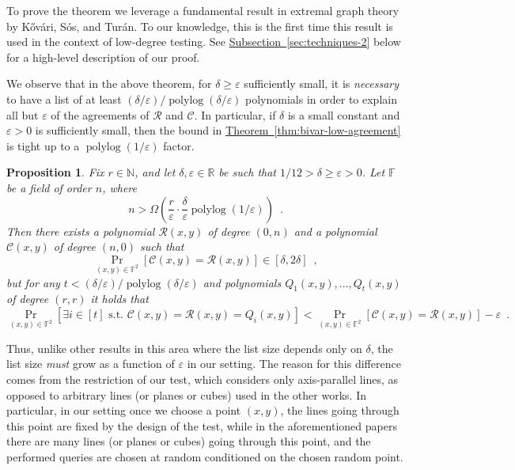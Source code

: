 \documentclass[11pt]{article}
\numberwithin{equation}{section}
\newtheorem{proposition}[theorem]{Proposition}
\theoremstyle{definition}
\theoremstyle{plain}
\newcommand{\expref}[2]{\hyperref[#2]{#1~\ref{#2}}}
\theoremstyle{plain}
\newcommand{\colored}{}
\newcommand{\blocklength}{\colored{n}} %
\newcommand{\Field}{\colored{\mathbb F}}
\newcommand{\st}{\colored{\text{ s.t. }}}
\newcommand{\degree}{\colored{r}}
\newcommand{\rowpoly}{\colored{\mathcal R}}
\newcommand{\colpoly}{\colored{\mathcal C}}
\newcommand{\prox}{\colored{\delta}}
\newcommand{\polylog}{\operatorname{polylog}}
\newcommand{\eps}{\varepsilon}
\newcommand{\Naturals}{\mathbb{N}}
\begin{document}
To prove the theorem we leverage a fundamental result in extremal graph theory by %
K\H{o}v\'{a}ri,    %
S\'{o}s, and Tur\'{a}n.
To our knowledge, this is the first time this result is used in the context of low-degree testing.
See \expref{Subsection}{sec:techniques-2} below for a high-level description of our proof.

We observe that in the above theorem, for $\prox \geq \eps$ sufficiently small, it is \emph{necessary} to have a
list of at least ${(\prox/\eps)}/{\polylog(\prox/\eps)}$ polynomials in order to explain all but $\eps$ of the agreements of $\rowpoly$ and $\colpoly$.
In particular, if $\prox$ is a small constant and $\eps>0$ is sufficiently small,
then the bound in \expref{Theorem}{thm:bivar-low-agreement} is tight up to a $\polylog(1/\eps)$ factor.

\begin{proposition}
\label{prop:list size lb}
Fix $\degree \in \Naturals$, and let $\prox, \eps \in \mathbb R$ be such that ${1}/{12} > \prox \geq \eps > 0$. Let $\Field$ be a field of
%
order   %
$\blocklength$, where
\[
  \blocklength > \Omega\left( \frac{\degree}{\eps} \cdot \frac{\delta}{\eps} \polylog({1}/{\eps})\right)\enspace.
\]
Then there exists a polynomial $\rowpoly(x,y)$ of degree
$(0,\blocklength)$ and a polynomial $\colpoly(x,y)$ of degree
$(\blocklength,0)$ such that
\begin{equation*}
\Pr_{(x,y) \in \Field^2}[\colpoly(x,y) = \rowpoly(x,y)] \in [\prox,2\prox] \enspace,
\end{equation*}
but for any $t < {(\prox/\eps)}/{\polylog(\prox/\eps)}$ and polynomials $Q_1(x,y),\dots,Q_t(x,y)$ of degree $(\degree,\degree)$ it holds that
\begin{equation*}
\Pr_{(x,y) \in \Field^2}
[\exists i \in [t] \st \colpoly(x,y) = \rowpoly(x,y)= Q_i(x,y)]
< \Pr_{(x,y) \in \Field^2}[\colpoly(x,y) = \rowpoly(x,y)] - \eps \enspace.
\end{equation*}
\end{proposition}

Thus, unlike other results in this area \cite{RazS97, AroraS03, BhangaleDN17} where the list size depends only on $\prox$, the list size \emph{must} grow as a function of $\eps$ in our setting. The reason for this difference comes from the restriction of our test, which considers only axis-parallel lines, as opposed to arbitrary lines (or planes or cubes) used in the other works. In particular, in our setting once we choose a point $(x,y)$, the lines going through this point are fixed by the design of the test, while in the
%
aforementioned papers  %
there are many lines (or planes or cubes) going through this point, and the performed queries are chosen at random conditioned on the chosen random point.
\end{document}
